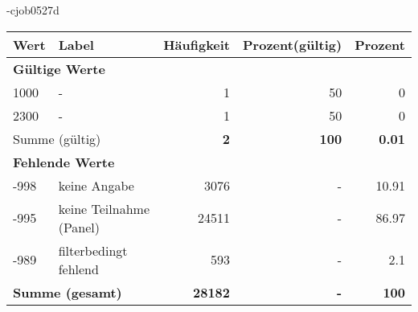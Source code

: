                 \vspace*{-\baselineskip}
					\begin{filecontents}{\jobname-cjob0527d}
					\begin{longtable}{lXrrr}
					\toprule
					\textbf{Wert} & \textbf{Label} & \textbf{Häufigkeit} & \textbf{Prozent(gültig)} & \textbf{Prozent} \\
					\endhead
					\midrule
					\multicolumn{5}{l}{\textbf{Gültige Werte}}\\

					1000 &
					\multicolumn{1}{X}{ -  } &


					  \num{1} &
					  \num[round-mode=places,round-precision=2]{50} &
					    \num[round-mode=places,round-precision=2]{0} \\

					2300 &
					\multicolumn{1}{X}{ -  } &


					  \num{1} &
					  \num[round-mode=places,round-precision=2]{50} &
					    \num[round-mode=places,round-precision=2]{0} \\
					\midrule
					\multicolumn{2}{l}{Summe (gültig)} &
					  \textbf{\num{2}} &
					\textbf{100} &
					  \textbf{\num[round-mode=places,round-precision=2]{0.01}} \\
					\multicolumn{5}{l}{\textbf{Fehlende Werte}}\\
							-998 &
							keine Angabe &
							  \num{3076} &
							 - &
							  \num[round-mode=places,round-precision=2]{10.91} \\
							-995 &
							keine Teilnahme (Panel) &
							  \num{24511} &
							 - &
							  \num[round-mode=places,round-precision=2]{86.97} \\
							-989 &
							filterbedingt fehlend &
							  \num{593} &
							 - &
							  \num[round-mode=places,round-precision=2]{2.1} \\
					\midrule
					\multicolumn{2}{l}{\textbf{Summe (gesamt)}} &
				      \textbf{\num{28182}} &
				    \textbf{-} &
				    \textbf{100} \\
					\bottomrule
					\end{longtable}
					\end{filecontents}
